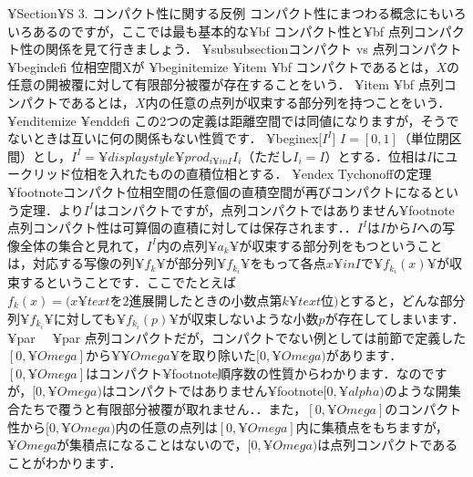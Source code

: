 ¥Section{¥S 3. コンパクト性に関する反例}
コンパクト性にまつわる概念にもいろいろあるのですが，ここでは最も基本的な{¥bf コンパクト性}と{¥bf 点列コンパクト性}の関係を見て行きましょう．
¥subsubsection{コンパクト vs 点列コンパクト}
¥begin{defi}
位相空間Xが
¥begin{itemize}
¥item {¥bf コンパクト}であるとは，$X$の任意の開被覆に対して有限部分被覆が存在することをいう．
¥item {¥bf 点列コンパクト}であるとは，$X$内の任意の点列が収束する部分列を持つことをいう．
¥end{itemize}
¥end{defi}
この2つの定義は距離空間では同値になりますが，そうでないときは互いに何の関係もない性質です．
¥begin{ex}[$I^I$]
$I=[0,1]$（単位閉区間）とし，$I^I=¥displaystyle ¥prod_{i¥in I}I_i$（ただし$I_i=I$）とする．位相は$I$にユークリッド位相を入れたものの直積位相とする．
¥end{ex}
Tychonoffの定理¥footnote{コンパクト位相空間の任意個の直積空間が再びコンパクトになるという定理．}より$I^I$はコンパクトですが，点列コンパクトではありません¥footnote{点列コンパクト性は可算個の直積に対しては保存されます．}．$I^I$は$I$から$I$への写像全体の集合と見れて，$I^I$内の点列$¥{a_k¥}$が収束する部分列をもつということは，対応する写像の列$¥{f_k¥}$が部分列$¥{f_{k_i}¥}$をもって各点$x¥in I$で$¥{ f_{k_i}(x) ¥}$が収束するということです．ここでたとえば$f_k(x)=(x¥text{を2進展開したときの小数点第}k¥text{位)}$とすると，どんな部分列$¥{f_{k_i}¥}$に対しても$¥{f_{k_i}(p)¥}$が収束しないような小数$p$が存在してしまいます．¥par 
　¥par
点列コンパクトだが，コンパクトでない例としては前節で定義した$[0,¥Omega]$から$¥{¥Omega¥}$を取り除いた$[0,¥Omega)$があります．$[0,¥Omega]$はコンパクト¥footnote{順序数の性質からわかります．}なのですが，$[0,¥Omega)$はコンパクトではありません¥footnote{$[0,¥alpha)$のような開集合たちで覆うと有限部分被覆が取れません．}．また，$[0,¥Omega]$のコンパクト性から$[0,¥Omega)$内の任意の点列は$[0,¥Omega]$内に集積点をもちますが，$¥Omega$が集積点になることはないので，$[0,¥Omega)$は点列コンパクトであることがわかります．

